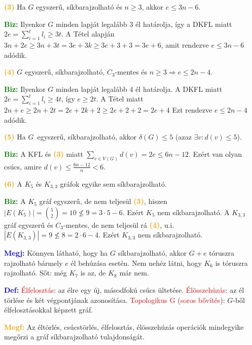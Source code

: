 \documentclass[../../szobeli.tex]{subfiles}
\begin{document}
\begin{itemize}
            \textcolor{orange}{\textbf{(3)}} Ha $G$ egyszerű, síkbarajzolható és $n \geq 3$, akkor $e \leq 3n - 6$.

            \textcolor{green}{\textbf{Biz:}} Ilyenkor $G$ minden lapját legalább 3 él határolja, így a DKFL miatt $2e = \sum_{i=1}^{t} l_i \geq 3t$. A Tétel alapján $3n + 2e \geq 3n + 3t = 3e + 3k \geq 3e + 3 + 3 = 3e + 6$, amit rendezve $e \leq 3n - 6$ adódik. 

            \textcolor{orange}{\textbf{(4)}} $G$ egyszerű, síkbarajzolható, $C_3$-mentes és $n \geq 3 \Rightarrow e \leq 2n - 4$. 

            \textcolor{green}{\textbf{Biz:}} Ilyenkor $G$ minden lapját legalább 4 él határolja. A DKFL miatt $2e = \sum_{i=1}^{t}l_i \geq 4t$, így $e \geq 2t$. A Tétel miatt $2n + e \geq 2n + 2t = 2e + 2k + 2 \geq 2e + 2 + 2 = 2e + 4$ Ezt rendezve $e \leq 2n - 4$ adódik. 

            \textcolor{orange}{\textbf{(5)}} Ha $G$ egyszerű, síkbarajzolható, akkor $\delta(G) \leq 5$ (azaz $\exists v : d(v) \leq 5$).

            \textcolor{green}{\textbf{Biz:}} A KFL és \textcolor{orange}{\textbf{(3)}} miatt $\sum_{v\in V(G)}d(v) = 2e \leq 6n - 12$. Ezért van olyan csúcs, amire $d(v) \leq \frac{6n-12}{n} < 6$. 

            \textcolor{orange}{\textbf{(6)}} A $K_5$ és $K_{3,3}$ gráfok egyike sem síkbarajzolható.

            \textcolor{green}{\textbf{Biz:}} A $K_5$ gráf egyszerű, de nem teljesül \textcolor{orange}{\textbf{(3)}}, hiszen $|E(K_5)| = \binom{5}{2} = 10 \nleq 9 = 3 \cdot 5 - 6$. Ezért $K_5$ nem síkbarajzolható. A $K_{3,3}$ gráf egyszerű és $C_3$-mentes, de nem teljesül rá \textcolor{orange}{\textbf{(4)}}, u.i. $|E(K_{3,3})| = 9 \nleq 8 = 2 \cdot 6 - 4$. Ezért $K_{3,3}$ nem síkbarajzolható. 

            \textcolor{blue}{\textbf{Megj:}} Könnyen látható, hogy ha $G$ síkbarajzolható, akkor $G + e$ tóruszra rajzolható bármely $e$ él behúzása esetén. Nem nehéz látni, hogy $K_6$ is tóruszra rajzolható. Sőt: még $K_7$ is az, de $K_8$ már nem. 

            \textcolor{blue}{\textbf{Def:}} \textcolor{red}{Élfelosztás}: az élre egy új, másodfokú csúcs ültetése. \textcolor{red}{Élösszehúzás}: az él törlése és két végpontjának azonosítása. \textcolor{red}{Topologikus G} (\textcolor{red}{soros bővítés}): $G$-ből élfelosztásokkal képzett gráf. 

            \textcolor{orange}{\textbf{Megf:}} Az éltörlés, csúcstörlés, élfelosztás, élösszehúzás operációk mindegyike megőrzi a gráf síkbarajzolható tulajdonságát. 


\end{itemize}
\end{document}

